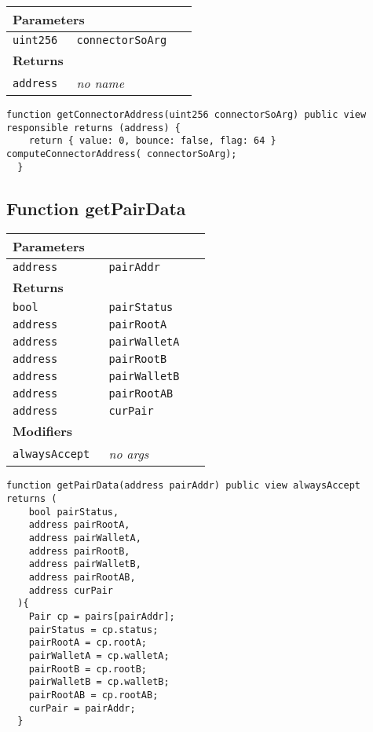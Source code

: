 \ifsoltables
\noindent\begin{tabular}{|l|l|p{5cm}|}\hline
\multicolumn{3}{|l|}{\bf Parameters}\\\hline
\tt uint256 & \tt connectorSoArg &\\\hline
\multicolumn{3}{|l|}{\bf Returns}\\\hline
\tt address & {\em no name} &\\\hline
\end{tabular}
\fi



\begin{lstlisting}[firstnumber=153]
  function getConnectorAddress(uint256 connectorSoArg) public view responsible returns (address) {
    return { value: 0, bounce: false, flag: 64 } computeConnectorAddress( connectorSoArg);
  }
\end{lstlisting}

\subsection{Function getPairData}


\ifsoltables
\noindent\begin{tabular}{|l|l|p{5cm}|}\hline
\multicolumn{3}{|l|}{\bf Parameters}\\\hline
\tt address & \tt pairAddr &\\\hline
\multicolumn{3}{|l|}{\bf Returns}\\\hline
\tt bool & \tt pairStatus &\\\hline
\tt address & \tt pairRootA &\\\hline
\tt address & \tt pairWalletA &\\\hline
\tt address & \tt pairRootB &\\\hline
\tt address & \tt pairWalletB &\\\hline
\tt address & \tt pairRootAB &\\\hline
\tt address & \tt curPair &\\\hline
\multicolumn{3}{|l|}{\bf Modifiers}\\\hline
\tt alwaysAccept & {\em no args} &\\\hline
\end{tabular}
\fi



\begin{lstlisting}[firstnumber=379]
  function getPairData(address pairAddr) public view alwaysAccept returns (
    bool pairStatus,
    address pairRootA,
    address pairWalletA,
    address pairRootB,
    address pairWalletB,
    address pairRootAB,
    address curPair
  ){
    Pair cp = pairs[pairAddr];
    pairStatus = cp.status;
    pairRootA = cp.rootA;
    pairWalletA = cp.walletA;
    pairRootB = cp.rootB;
    pairWalletB = cp.walletB;
    pairRootAB = cp.rootAB;
    curPair = pairAddr;
  }
\end{lstlisting}

